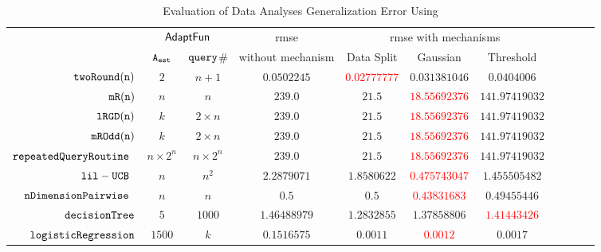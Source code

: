 {\footnotesize
\begin {table}[H]
        \vspace{-0.2cm}
        \caption{Evaluation of Data Analyses Generalization Error Using {\THESYSTEM}}
    \vspace{-0.2cm}
        \label{tb:adapt-imp}
        \begin{center}
        \centering
{\tiny
        \begin{tabular}{| >{\tiny}r | c | c | c | c | c | c | c | c | c | c  }
         \hline \hline
        \multirow{2}{*}{Program $c$}
         & \multicolumn{2}{c|}{$\textsf{AdaptFun}$}
         & {rmse}
         & \multicolumn{3}{c|}{rmse with mechanisms} \\ 
         \cline{2-3} \cline{5-7}
         & {${\mathtt{A_{est}}}$ } & {${\tt query}$\# } &  without mechanism & Data Split & Gaussian & Threshold  \\ 
         \cline{6-7}
         \hline \hline
         $  \mathtt{ twoRound(n) }$ & $ 2 $ & $  n + 1 $ & $0.0502245$   & \textcolor{red}{$0.02777777$} & {$0.031381046$} & $0.0404006$  \\
         $  \mathtt{ mR(n) }$ & $ n $ & $  n  $ & $239.0$   & $21.5$ & \textcolor{red}{$18.55692376$} & $141.97419032$  \\
         $  \mathtt{ lRGD(n) }$ & $ k $ & $  2\times n $ & $239.0$   & $21.5$ & \textcolor{red}{$18.55692376$} & $141.97419032$  \\
         $  \mathtt{ mROdd(n) }$ & $ k $ & $  2 \times n $ & $239.0$   & $21.5$ & \textcolor{red}{$18.55692376$} & $141.97419032$  \\
         $  \mathtt{repeatedQueryRoutine}$~\cite{Jamieson2015TheAO} & $ n \times 2^n $ & $  n \times 2^n $ & $239.0$   & $21.5$ & \textcolor{red}{$18.55692376$} & $141.97419032$  \\
         $  \mathtt{lil-UCB}$~\cite{Jamieson2015TheAO} & $ n $ & $  n^2 $ & $ 2.2879071$   & $ 1.8580622$ & \textcolor{red}{$0.475743047$} & $ 1.455505482 $  \\
         $  \mathtt{nDimensionPairwise}$~\cite{Jamieson2015TheAO} & $ n $ & $  n  $ & $0.5$   & $0.5$ & \textcolor{red}{$ 0.43831683 $} & {$0.49455446$}  \\
         $  \mathtt{decisionTree}$ & $5$ &  $1000$ & $ 1.46488979 $  & $ 1.2832855 $ & $ 1.37858806 $ & \textcolor{red}{$1.41443426 $}  \\
         $  \mathtt{logisticRegression}$ & $1500$ &  $k$ & $ 0.1516575 $  &  $ 0.0011 $ & \textcolor{red}{$0.0012$} & {$0.0017$}   \\

\end{tabular}}
\end{center}
\end{table}}
